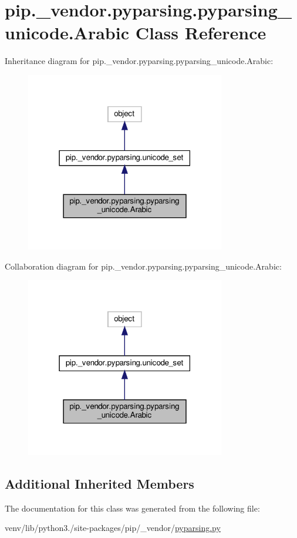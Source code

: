 \hypertarget{classpip_1_1__vendor_1_1pyparsing_1_1pyparsing__unicode_1_1Arabic}{}\section{pip.\+\_\+vendor.\+pyparsing.\+pyparsing\+\_\+unicode.\+Arabic Class Reference}
\label{classpip_1_1__vendor_1_1pyparsing_1_1pyparsing__unicode_1_1Arabic}


Inheritance diagram for pip.\+\_\+vendor.\+pyparsing.\+pyparsing\+\_\+unicode.\+Arabic\+:
\nopagebreak
\begin{figure}[H]
\begin{center}
\leavevmode
\includegraphics[width=247pt]{classpip_1_1__vendor_1_1pyparsing_1_1pyparsing__unicode_1_1Arabic__inherit__graph}
\end{center}
\end{figure}


Collaboration diagram for pip.\+\_\+vendor.\+pyparsing.\+pyparsing\+\_\+unicode.\+Arabic\+:
\nopagebreak
\begin{figure}[H]
\begin{center}
\leavevmode
\includegraphics[width=247pt]{classpip_1_1__vendor_1_1pyparsing_1_1pyparsing__unicode_1_1Arabic__coll__graph}
\end{center}
\end{figure}
\subsection*{Additional Inherited Members}


The documentation for this class was generated from the following file\+:\begin{DoxyCompactItemize}
\item 
venv/lib/python3./site-\/packages/pip/\+\_\+vendor/\hyperlink{pip_2__vendor_2pyparsing_8py}{pyparsing.\+py}\end{DoxyCompactItemize}
